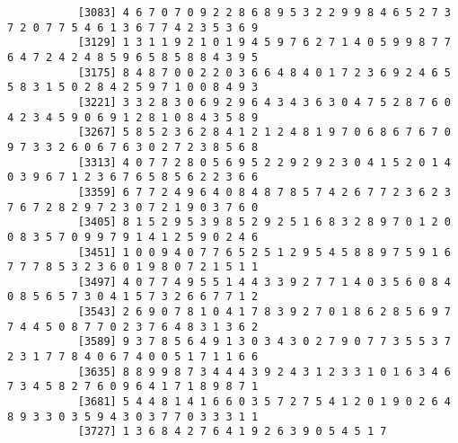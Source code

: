 \documentclass{article}
\begin{document}
\begin{itemize}
\begin{scriptsize}
\begin{verbatim}
		   [3083] 4 6 7 0 7 0 9 2 2 8 6 8 9 5 3 2 2 9 9 8 4 6 5 2 7 3 7 2 0 7 7 5 4 6 1 3 6 7 7 4 2 3 5 3 6 9
		   [3129] 1 3 1 1 9 2 1 0 1 9 4 5 9 7 6 2 7 1 4 0 5 9 9 8 7 7 6 4 7 2 4 2 4 8 5 9 6 5 8 5 8 8 4 3 9 5
		   [3175] 8 4 8 7 0 0 2 2 0 3 6 6 4 8 4 0 1 7 2 3 6 9 2 4 6 5 5 8 3 1 5 0 2 8 4 2 5 9 7 1 0 0 8 4 9 3
		   [3221] 3 3 2 8 3 0 6 9 2 9 6 4 3 4 3 6 3 0 4 7 5 2 8 7 6 0 4 2 3 4 5 9 0 6 9 1 2 8 1 0 8 4 3 5 8 9
		   [3267] 5 8 5 2 3 6 2 8 4 1 2 1 2 4 8 1 9 7 0 6 8 6 7 6 7 0 9 7 3 3 2 6 0 6 7 6 3 0 2 7 2 3 8 5 6 8
		   [3313] 4 0 7 7 2 8 0 5 6 9 5 2 2 9 2 9 2 3 0 4 1 5 2 0 1 4 0 3 9 6 7 1 2 3 6 7 6 5 8 5 6 2 2 3 6 6
		   [3359] 6 7 7 2 4 9 6 4 0 8 4 8 7 8 5 7 4 2 6 7 7 2 3 6 2 3 7 6 7 2 8 2 9 7 2 3 0 7 2 1 9 0 3 7 6 0
		   [3405] 8 1 5 2 9 5 3 9 8 5 2 9 2 5 1 6 8 3 2 8 9 7 0 1 2 0 0 8 3 5 7 0 9 9 7 9 1 4 1 2 5 9 0 2 4 6
		   [3451] 1 0 0 9 4 0 7 7 6 5 2 5 1 2 9 5 4 5 8 8 9 7 5 9 1 6 7 7 7 8 5 3 2 3 6 0 1 9 8 0 7 2 1 5 1 1
		   [3497] 4 0 7 7 4 9 5 5 1 4 4 3 3 9 2 7 7 1 4 0 3 5 6 0 8 4 0 8 5 6 5 7 3 0 4 1 5 7 3 2 6 6 7 7 1 2
		   [3543] 2 6 9 0 7 8 1 0 4 1 7 8 3 9 2 7 0 1 8 6 2 8 5 6 9 7 7 4 4 5 0 8 7 7 0 2 3 7 6 4 8 3 1 3 6 2
		   [3589] 9 3 7 8 5 6 4 9 1 3 0 3 4 3 0 2 7 9 0 7 7 3 5 5 3 7 2 3 1 7 7 8 4 0 6 7 4 0 0 5 1 7 1 1 6 6
		   [3635] 8 8 9 9 8 7 3 4 4 4 3 9 2 4 3 1 2 3 3 1 0 1 6 3 4 6 7 3 4 5 8 2 7 6 0 9 6 4 1 7 1 8 9 8 7 1
		   [3681] 5 4 4 8 1 4 1 6 6 0 3 5 7 2 7 5 4 1 2 0 1 9 0 2 6 4 8 9 3 3 0 3 5 9 4 3 0 3 7 7 0 3 3 3 1 1
		   [3727] 1 3 6 8 4 2 7 6 4 1 9 2 6 3 9 0 5 4 5 1 7
	

\end{verbatim}
\end{scriptsize}
\end{itemize}
\end{document}

